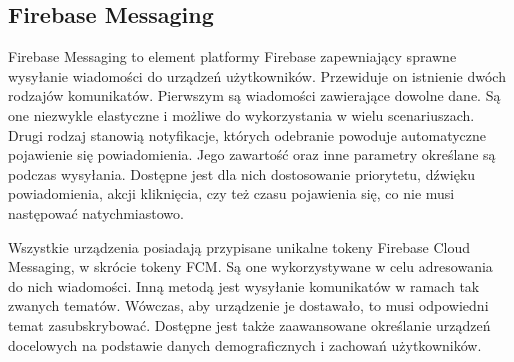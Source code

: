 \subsection{Firebase Messaging}
Firebase Messaging to element platformy Firebase zapewniający sprawne wysyłanie wiadomości do urządzeń użytkowników. Przewiduje on istnienie dwóch rodzajów komunikatów. Pierwszym są wiadomości zawierające dowolne dane. Są one niezwykle elastyczne i możliwe do wykorzystania w wielu scenariuszach. Drugi rodzaj stanowią notyfikacje, których odebranie powoduje automatyczne pojawienie się powiadomienia. Jego zawartość oraz inne parametry określane są podczas wysyłania. Dostępne jest dla nich dostosowanie priorytetu, dźwięku powiadomienia, akcji kliknięcia, czy też czasu pojawienia się, co nie musi następować natychmiastowo.

Wszystkie urządzenia posiadają przypisane unikalne tokeny Firebase Cloud Messaging, w skrócie tokeny FCM. Są one wykorzystywane w celu adresowania do nich wiadomości. Inną metodą jest wysyłanie komunikatów w ramach tak zwanych tematów. Wówczas, aby urządzenie je dostawało, to musi odpowiedni temat zasubskrybować. Dostępne jest także zaawansowane określanie urządzeń docelowych na podstawie danych demograficznych i zachowań użytkowników.






